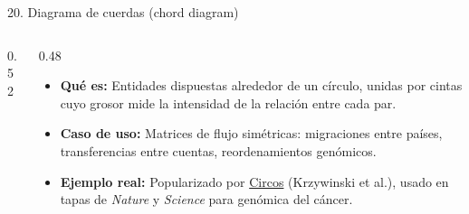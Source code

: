 \documentclass[aspectratio=169,9pt]{beamer}
\newcommand{\ficha}[3]{%
\begin{itemize}
\item \textbf{Qué es:} #1
\item \textbf{Caso de uso:} #2
\item \textbf{Ejemplo real:} #3
\end{itemize}}
\begin{document}
\begin{frame}{20. Diagrama de cuerdas (chord diagram)}
\begin{columns}[T]
\begin{column}{0.52\textwidth}
\centering
{}
\end{column}
\begin{column}{0.48\textwidth}
\ficha{Entidades dispuestas alrededor de un círculo, unidas por cintas cuyo grosor mide la intensidad de la relación entre cada par.}
{Matrices de flujo simétricas: migraciones entre países, transferencias entre cuentas, reordenamientos genómicos.}
{Popularizado por \href{https://circos.ca/}{Circos} (Krzywinski et al.), usado en tapas de \emph{Nature} y \emph{Science} para genómica del cáncer.}
\end{column}
\end{columns}
\end{frame}
\end{document}
